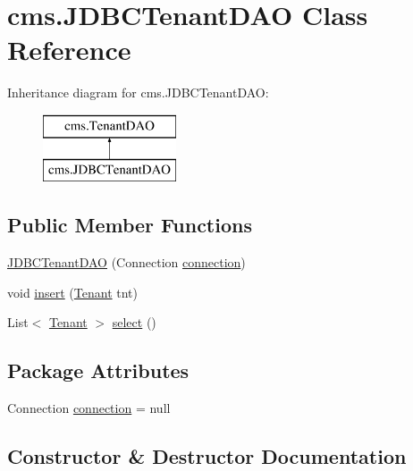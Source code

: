 \hypertarget{classcms_1_1_j_d_b_c_tenant_d_a_o}{}\section{cms.\+J\+D\+B\+C\+Tenant\+D\+AO Class Reference}
\label{classcms_1_1_j_d_b_c_tenant_d_a_o}
Inheritance diagram for cms.\+J\+D\+B\+C\+Tenant\+D\+AO\+:\begin{figure}[H]
\begin{center}
\leavevmode
\includegraphics[height=2.000000cm]{classcms_1_1_j_d_b_c_tenant_d_a_o}
\end{center}
\end{figure}
\subsection*{Public Member Functions}
\begin{DoxyCompactItemize}
\item 
\mbox{\hyperlink{classcms_1_1_j_d_b_c_tenant_d_a_o_abb0023657a39a71998bb10663f13da4c}{J\+D\+B\+C\+Tenant\+D\+AO}} (Connection \mbox{\hyperlink{classcms_1_1_j_d_b_c_tenant_d_a_o_a08dc3f2801dc5348c6473632b342d62a}{connection}})
\item 
void \mbox{\hyperlink{classcms_1_1_j_d_b_c_tenant_d_a_o_a76c9d02d8ea133d2f38744f15726ace9}{insert}} (\mbox{\hyperlink{classcms_1_1_tenant}{Tenant}} tnt)
\item 
List$<$ \mbox{\hyperlink{classcms_1_1_tenant}{Tenant}} $>$ \mbox{\hyperlink{classcms_1_1_j_d_b_c_tenant_d_a_o_ac021642b8b94d054fbdc74cd87b4a98d}{select}} ()
\end{DoxyCompactItemize}
\subsection*{Package Attributes}
\begin{DoxyCompactItemize}
\item 
Connection \mbox{\hyperlink{classcms_1_1_j_d_b_c_tenant_d_a_o_a08dc3f2801dc5348c6473632b342d62a}{connection}} = null
\end{DoxyCompactItemize}


\subsection{Constructor \& Destructor Documentation}
\mbox{\label{classcms_1_1_j_d_b_c_tenant_d_a_o_abb0023657a39a71998bb10663f13da4c}} 
